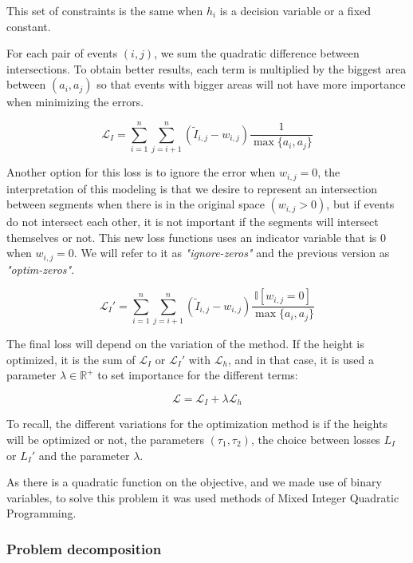 This set of constraints is the same when $h_i$ is a decision variable or a fixed constant.

For each pair of events $(i, j)$, we sum the quadratic difference between intersections. 
%
To obtain better results, each term is multiplied by the biggest area between $(a_i, a_j)$ so that events with bigger areas will not have more importance when minimizing the errors.

\begin{equation}
    \mathcal{L}_I = \sum_{i = 1}^n \sum_{j = i + 1}^n (\tilde I_{i, j} - w_{i, j}) \dfrac{1}{\max \{ a_i, a_j\} }
\end{equation}

Another option for this loss is to ignore the error when $w_{i, j} = 0$, the interpretation of this modeling is that we desire to represent an intersection between segments when there is in the original space $(w_{i, j} > 0)$, 
%
but if events do not intersect each other, it is not important if the segments will intersect themselves or not.
%
This new loss functions uses an indicator variable that is $0$ when $w_{i, j} = 0$.
We will refer to it as \textit{"ignore-zeros"} and the previous version as \textit{"optim-zeros"}.

\begin{equation}
    \mathcal{L}_I' = \sum_{i = 1}^n \sum_{j = i + 1}^n (\tilde I_{i, j} - w_{i, j}) \dfrac{ \mathbb{I}[w_{i, j} = 0 ]}{\max \{ a_i, a_j\}}
\end{equation}

The final loss will depend on the variation of the method. If the height is optimized, it is the sum of $\mathcal{L}_I$ or $\mathcal{L}_I'$ with $\mathcal{L}_h$, 
%
and in that case, it is used a parameter $\lambda \in \mathbb{R}^+$ to set importance for the different terms:

\begin{equation}
    \mathcal{L} = \mathcal{L}_I + \lambda \mathcal{L}_h
\end{equation}

To recall, the different variations for the optimization method is if the heights will be optimized or not, the parameters $(\tau_1, \tau_2)$, the choice between losses $L_I$ or $L_I'$ and the parameter $\lambda$.

As there is a quadratic function on the objective, and we made use of binary variables, to solve this problem it was used methods of Mixed Integer Quadratic Programming.

\subsubsection{Problem decomposition}

